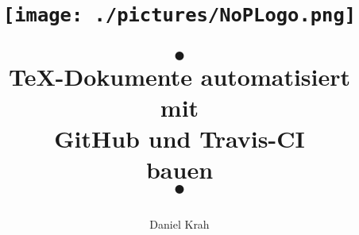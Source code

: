 \documentclass[landscape]{article}
\title{
\color{white}
\begin{center}
 \texttt{[image: ./pictures/NoPLogo.png]}
\end{center}
 $\bullet$ \\
 \color{black}
 \color{black}
 TeX-Dokumente automatisiert \\mit \\GitHub und Travis-CI \\bauen \\
\color{white}
$\bullet$ \\
\color{black}
}
\author{Daniel Krah}
\begin{document}
\huge


\sectionfont{\Huge}
\subsectionfont{\Huge}
\subsubsectionfont{\Huge}
\paragraphfont{\Huge}


\AddToShipoutPicture{\BackgroundPic}
\maketitle%



%
% 



%

% 
\newpage




% 



% 
% 
% 
% 

% 




% 
% 
% 
% 
% 
% 


% 






% 
% 
% 
% 
% 
% 
% 




%
\end{document}
